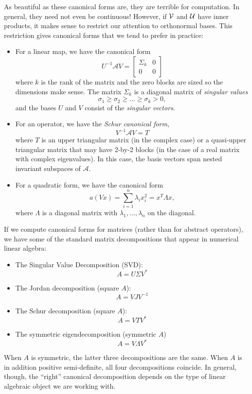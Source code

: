 \documentclass[12pt, leqno]{article} %
\begin{document}
As beautiful as these canonical forms are, they are terrible for
computation.  In general, they need not even be continuous!
However, if $\cal{V}$ and $\cal{U}$ have inner products, it makes
sense to restrict our attention to orthonormal bases.  This
restriction gives canonical forms that we tend to prefer in practice:
\begin{itemize}
\item For a linear map, we have the canonical form
  \[
    U^{-1} \mathcal{A} V = \begin{bmatrix} \Sigma_k & 0 \\ 0 & 0 \end{bmatrix}
  \]
  where $k$ is the rank of the matrix and the zero blocks are sized
  so the dimensions make sense.  The matrix $\Sigma_k$ is a diagonal
  matrix of {\em singular values}
  \[
    \sigma_1 \geq \sigma_2 \geq \ldots \geq \sigma_k > 0,
  \]
  and the bases $U$ and $V$ consist of the {\em singular vectors}.  
\item For an operator, we have the {\em Schur canonical form},
  \[
    V^{-1} \mathcal{A} V = T
  \]
  where $T$ is an upper triangular matrix (in the complex case) or
  a quasi-upper triangular matrix that may have 2-by-2 blocks
  (in the case of a real matrix with complex eigenvalues).
  In this case, the basis vectors span nested invariant subspaces
  of $\mathcal{A}$.
\item For a quadratic form, we have the canonical form
  \[
    a(Vx) = \sum_{i=1}^{n} \lambda_i x_i^2 = x^T \Lambda x,
  \]
  where $\Lambda$ is a diagonal matrix with $\lambda_1, \ldots,
  \lambda_n$ on the diagonal.
\end{itemize}

If we compute canonical forms for matrices (rather than for abstract
operators), we have some of the standard matrix decompositions that
appear in numerical linear algebra:
\begin{itemize}
\item The Singular Value Decomposition (SVD):
  \[
    A = U \Sigma V^*
  \]
\item The Jordan decomposition (square $A$):
  \[
    A = V J V^{-1}
  \]
\item The Schur decomposition (square $A$):
  \[
    A = V T V^{*}
  \]
\item The symmetric eigendecomposition (symmetric $A$)
  \[
    A = V \Lambda V^*
  \]
\end{itemize}
When $A$ is symmetric, the latter three decompositions are the same.
When $A$ is in addition positive semi-definite, all four decompositions
coincide.  In general, though, the ``right'' canonical decomposition
depends on the type of linear algebraic object we are working with.
\end{document}
